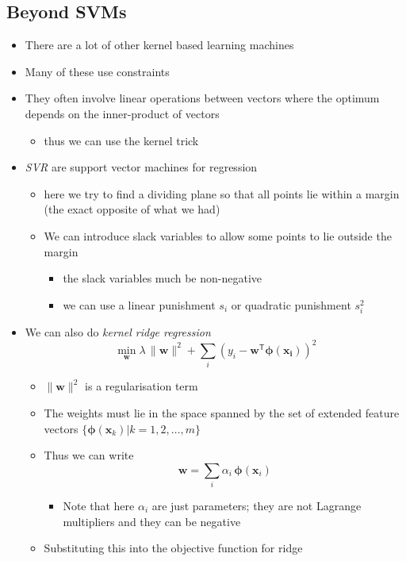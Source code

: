 \documentclass[11pt]{article}
\newcommand{\tr}{\textsf{T}}
\begin{document}
\subsection{Beyond SVMs}
\label{sec:org0d4b6b5}
\begin{itemize}
\item There are a lot of other kernel based learning machines
\item Many of these use constraints
\item They often involve linear operations between vectors where the
optimum depends on the inner-product of vectors
\begin{itemize}
\item thus we can use the kernel trick
\end{itemize}
\item \emph{SVR} are support vector machines for regression
\begin{itemize}
\item here we try to find a dividing plane so that all points lie
within a margin (the exact opposite of what we had)
\item We can introduce slack variables to allow some points to lie
outside the margin
\begin{itemize}
\item the slack variables much be non-negative
\item we can use a linear punishment \(s_i\) or quadratic punishment \(s_i^2\)
\end{itemize}
\end{itemize}
\item We can also do \emph{kernel  ridge regression}
$$ \min_{\bm{w}} \lambda\,\| \bm{w} \|^2 + \sum_i \left( y_i -
      \bm{w}^\tr \bm{\phi}(\bm{x_i}) \right)^2 $$
\begin{itemize}
\item \(\| \bm{w} \|^2\) is a regularisation term
\item The weights must lie in the space spanned by the set of extended
feature vectors \(\{\bm{\phi}(\bm{x}_k) | k=1,2,\ldots,m\}\)
\item Thus we can write
$$ \bm{w} = \sum_i \alpha_i \,\bm{\phi}(\bm{x}_i) $$
\begin{itemize}
\item Note that here \(\alpha_i\) are just parameters; they are not
Lagrange multipliers and they can be negative
\end{itemize}
\item Substituting this into the objective function for ridge

\end{itemize}
\end{itemize}
\end{document}
